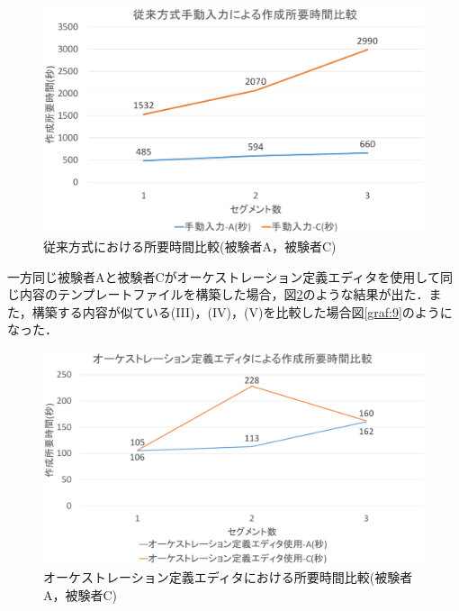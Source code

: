 \documentclass[mingoth]{kut-paper}		%
\begin{document}
\begin{description}
		\begin{figure}[H]
			\begin{center}
				\includegraphics[scale=0.45]{Document/ManualComparisonAC.eps}
				\caption{従来方式における所要時間比較(被験者A，被験者C)}
				\label{graf:4}
			\end{center}
		\end{figure}
		\newpage
		一方同じ被験者Aと被験者Cがオーケストレーション定義エディタを使用して同じ内容のテンプレートファイルを構築した場合，図\ref{graf:5}のような結果が出た．また，構築する内容が似ている(I\hspace{-1pt}I\hspace{-1pt}I)，(I\hspace{-1pt}V)，(V)を比較した場合図\ref{graf:9}のようになった．
			
		\begin{figure}[H]
			\begin{center}
				\includegraphics[scale=0.45]{Document/EditorComparisonAC.eps}
				\caption{オーケストレーション定義エディタにおける所要時間比較(被験者A，被験者C)}
				\label{graf:5}
			\end{center}
		\end{figure}
		

\end{description}
\end{document}
